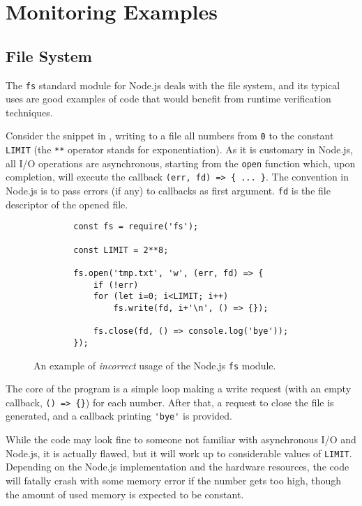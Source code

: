 \section{Monitoring Examples}
\label{sec:examples}
\subsection{File System}
The \lstinline{fs} standard module for Node.js deals with the file system, and its typical uses are good examples of code that would benefit from runtime verification techniques.

Consider the snippet in , writing to a file all numbers from \lstinline{0} to the constant \lstinline{LIMIT} (the \lstinline{**} operator stands for exponentiation).
As it is customary in Node.js, all I/O operations are asynchronous, starting from the \lstinline{open} function which, upon completion, will execute the callback \lstinline!(err, fd) => { ... }!.
The convention in Node.js is to pass errors (if any) to callbacks as first argument.
\lstinline{fd} is the file descriptor of the opened file.

\begin{figure}[h]
	\begin{lstlisting}
		const fs = require('fs');
		
		const LIMIT = 2**8;
		
		fs.open('tmp.txt', 'w', (err, fd) => {
			if (!err)
			for (let i=0; i<LIMIT; i++)
				fs.write(fd, i+'\n', () => {});
			
			fs.close(fd, () => console.log('bye'));
		});
	\end{lstlisting}
	\caption{An example of \emph{incorrect} usage of the Node.js \lstinline{fs} module.}
	\label{lst:fs}
\end{figure}

The core of the program is a simple loop making a write request (with an empty callback, \lstinline!() => {}!) for each number.
After that, a request to close the file is generated, and a callback printing \lstinline{'bye'} is provided.

While the code may look fine to someone not familiar with asynchronous I/O and Node.js, it is actually flawed, but it will work up to considerable values of \lstinline{LIMIT}.
Depending on the Node.js implementation and the hardware resources, the code will fatally crash with some memory error if the number gets too high, though the amount of used memory is expected to be constant.

